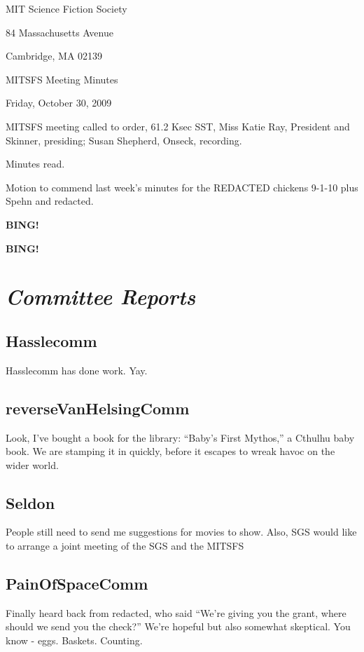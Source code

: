 \documentclass[10pt]{article}
\newcommand{\bing}{{\bf BING!} }
\newcommand{\goto}[1]{\bing \vskip 12pt \section*{{\em{#1}}}}
\newcommand{\ps}{ plus Spehn\xspace}
\begin{document}
\begin{center}

MIT Science Fiction Society

84 Massachusetts Avenue

Cambridge, MA 02139

\vspace{12pt}

MITSFS Meeting Minutes

Friday, October 30, 2009

\end{center}

\vspace{18pt}

\setlength{\parskip}{6pt}

\noindent
MITSFS meeting called to order, 61.2 Ksec SST,
Miss Katie Ray, President and Skinner, presiding; Susan Shepherd, Onseck, recording.

Minutes read.

Motion to commend last week's minutes for the REDACTED chickens 9-1-10\ps and redacted.

\bing

\goto{Committee Reports}

\subsection*{Hasslecomm}
Hasslecomm has done work. Yay.

\subsection*{reverseVanHelsingComm}
Look, I've bought a book for the library: ``Baby's First Mythos,'' a Cthulhu baby book. We are stamping it in quickly, before it escapes to wreak havoc on the wider world.

\subsection*{Seldon}
People still need to send me suggestions for movies to show. Also, SGS would like to arrange a joint meeting of the SGS and the MITSFS

\subsection*{PainOfSpaceComm}
Finally heard back from redacted, who said ``We're giving you the grant, where should we send you the check?'' We're hopeful but also somewhat skeptical. You know - eggs. Baskets. Counting.
\end{document}
